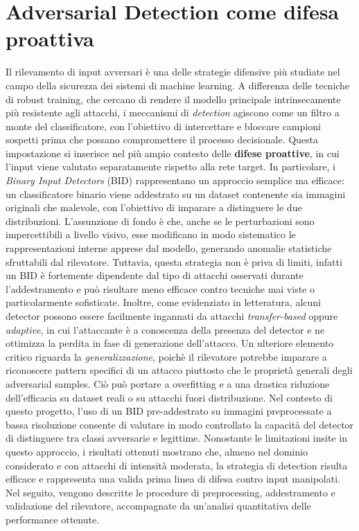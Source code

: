     \section{Adversarial Detection come difesa proattiva}
        Il rilevamento di input avversari è una delle strategie difensive più studiate nel campo della sicurezza dei sistemi di machine learning. A differenza delle tecniche di robust training, che cercano di rendere il modello principale intrinsecamente più resistente agli attacchi, i meccanismi di \textit{detection} agiscono come un filtro a monte del classificatore, con l’obiettivo di intercettare e bloccare campioni sospetti prima che possano compromettere il processo decisionale.
        Questa impostazione si inserisce nel più ampio contesto delle \textbf{difese proattive}, in cui l’input viene valutato separatamente rispetto alla rete target. In particolare, i \textit{Binary Input Detectors} (BID) rappresentano un approccio semplice ma efficace: un classificatore binario viene addestrato su un dataset contenente sia immagini originali che malevole, con l’obiettivo di imparare a distinguere le due distribuzioni.
        L’assunzione di fondo è che, anche se le perturbazioni sono impercettibili a livello visivo, esse modificano in modo sistematico le rappresentazioni interne apprese dal modello, generando anomalie statistiche sfruttabili dal rilevatore. Tuttavia, questa strategia non è priva di limiti, infatti un BID è fortemente dipendente dal tipo di attacchi osservati durante l’addestramento e può risultare meno efficace contro tecniche mai viste o particolarmente sofisticate. Inoltre, come evidenziato in letteratura, alcuni detector possono essere facilmente ingannati da attacchi \textit{transfer-based} oppure \textit{adaptive}, in cui l’attaccante è a conoscenza della presenza del detector e ne ottimizza la perdita in fase di generazione dell’attacco.
        Un ulteriore elemento critico riguarda la \textit{generalizzazione}, poichè il rilevatore potrebbe imparare a riconoscere pattern specifici di un attacco piuttosto che le proprietà generali degli adversarial samples. Ciò può portare a overfitting e a una drastica riduzione dell’efficacia su dataset reali o su attacchi fuori distribuzione.
        Nel contesto di questo progetto, l’uso di un BID pre-addestrato su immagini preprocessate a bassa risoluzione consente di valutare in modo controllato la capacità del detector di distinguere tra classi avversarie e legittime. Nonostante le limitazioni insite in questo approccio, i risultati ottenuti mostrano che, almeno nel dominio considerato e con attacchi di intensità moderata, la strategia di detection risulta efficace e rappresenta una valida prima linea di difesa contro input manipolati.
        Nel seguito, vengono descritte le procedure di preprocessing, addestramento e validazione del rilevatore, accompagnate da un'analisi quantitativa delle performance ottenute.

